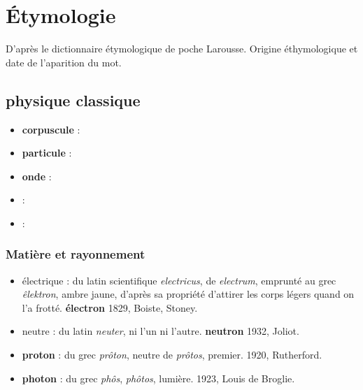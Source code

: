 
\section{Étymologie}
%
D'après le dictionnaire étymologique de poche Larousse. Origine éthymologique et date de l'aparition du mot.


\subsection{physique classique}
\begin{itemize}[leftmargin=1cm, label=, itemsep=1pt]
\item {\bf corpuscule} : 
\item {\bf particule} : 
\item {\bf onde} : 
\item {\bf } : 
\item {\bf } : 
\end{itemize}

\subsubsection{Matière et rayonnement}
\begin{itemize}[leftmargin=1cm, label=, itemsep=1pt]
\item électrique : du latin scientifique {\it electricus}, de {\it electrum}, emprunté au grec {\it êlektron}, ambre jaune, d'après sa propriété d'attirer les corps légers quand on l'a frotté. {\bf électron} 1829, Boiste, Stoney.
\item neutre : du latin {\it neuter}, ni l'un ni l'autre. {\bf neutron} 1932, Joliot.
\item {\bf proton} : du grec {\it prôton}, neutre de {\it prôtos}, premier. 1920, Rutherford.
\item {\bf photon} : du grec {\it phôs}, {\it phôtos}, lumière. 1923, Louis de Broglie.
\end{itemize}

